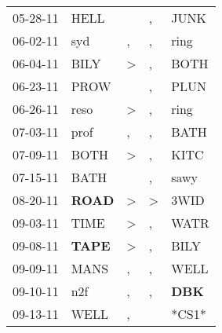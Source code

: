 \begin{supertabular}{p{0.07\textwidth}p{0.06\textwidth}p{0.02\textwidth}p{0.02\textwidth}p{0.06\textwidth}}
          05-28-11\textsuperscript{} &           HELL\textsuperscript{} &                  &                , &           JUNK\textsuperscript{} \\
          06-02-11\textsuperscript{} &            syd\textsuperscript{} &                , &                , &           ring\textsuperscript{} \\
          06-04-11\textsuperscript{} &           BILY\textsuperscript{} &     \textgreater &                , &           BOTH\textsuperscript{} \\
          06-23-11\textsuperscript{} &           PROW\textsuperscript{} &                  &                , &           PLUN\textsuperscript{} \\
          06-26-11\textsuperscript{} &           reso\textsuperscript{} &     \textgreater &                , &           ring\textsuperscript{} \\
          07-03-11\textsuperscript{} &           prof\textsuperscript{} &                , &                , &           BATH\textsuperscript{} \\
          07-09-11\textsuperscript{} &           BOTH\textsuperscript{} &     \textgreater &                , &           KITC\textsuperscript{} \\
          07-15-11\textsuperscript{} &           BATH\textsuperscript{} &                  &                , &           sawy\textsuperscript{} \\
          08-20-11\textsuperscript{} &  \textbf{ROAD\textsuperscript{}} &     \textgreater &     \textgreater &           3WID\textsuperscript{} \\
          09-03-11\textsuperscript{} &           TIME\textsuperscript{} &     \textgreater &                , &           WATR\textsuperscript{} \\
          09-08-11\textsuperscript{} &  \textbf{TAPE\textsuperscript{}} &     \textgreater &                , &           BILY\textsuperscript{} \\
          09-09-11\textsuperscript{} &           MANS\textsuperscript{} &                , &                , &           WELL\textsuperscript{} \\
          09-10-11\textsuperscript{} &            n2f\textsuperscript{} &                , &                , &   \textbf{DBK\textsuperscript{}} \\
          09-13-11\textsuperscript{} &           WELL\textsuperscript{} &                , &                  &                            *CS1* \\

\end{supertabular}
